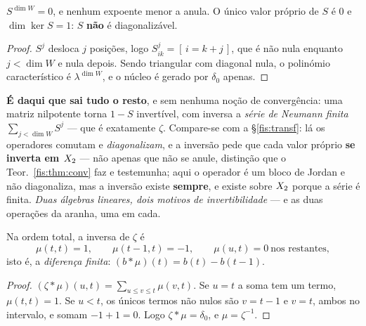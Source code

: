 \documentclass[livro.tex]{subfiles}
\begin{document}
\begin{lema}\label{fis:lem:nilp}
$S^{\dim W}=0$, e nenhum expoente menor a anula. O único valor próprio de $S$ é
$0$ e $\dim\ker S=1$: $S$ \textbf{não} é diagonalizável.
\end{lema}

\begin{proof}
$S^{j}$ desloca $j$ posições, logo $S^{j}_{ik}=[\,i=k+j\,]$, que é não nula
enquanto $j<\dim W$ e nula depois. Sendo triangular com diagonal nula, o
polinómio característico é $\lambda^{\dim W}$, e o núcleo é gerado por $\delta_0$
apenas.
\end{proof}

\medskip\noindent\textbf{É daqui que sai tudo o resto}, e sem nenhuma noção de
convergência: uma matriz nilpotente torna $1-S$ invertível, com inversa a
\emph{série de Neumann finita} $\sum_{j<\dim W}S^{j}$ --- que é exatamente
$\zeta$. Compare-se com a §\ref{fis:transf}: lá os operadores comutam e
\emph{diagonalizam}, e a inversão pede que cada valor próprio \textbf{se
inverta em $X_2$} --- não apenas que não se anule, distinção que o
Teor.~\ref{fis:thm:conv} faz e testemunha; aqui o operador é um bloco de Jordan
e não diagonaliza, mas a inversão existe \textbf{sempre}, e existe sobre $X_2$
porque a série é finita. \emph{Duas álgebras lineares, dois motivos de
invertibilidade} --- e as duas operações da aranha, uma em cada.

\begin{teorema}[$\mu=\zeta^{-1}$ na ordem total]\label{fis:thm:mu}
Na ordem total, a inversa de $\zeta$ é
\[
\mu(t,t)=1,\qquad \mu(t-1,t)=-1,\qquad \mu(u,t)=0\ \text{nos restantes},
\]
isto é, a \emph{diferença finita}: $(b*\mu)(t)=b(t)-b(t-1)$.
\end{teorema}

\begin{proof}
$(\zeta*\mu)(u,t)=\sum_{u\le v\le t}\mu(v,t)$. Se $u=t$ a soma tem um termo,
$\mu(t,t)=1$. Se $u<t$, os únicos termos não nulos são $v=t-1$ e $v=t$, ambos no
intervalo, e somam $-1+1=0$. Logo $\zeta*\mu=\delta_0$, e $\mu=\zeta^{-1}$.
\end{proof}
\end{document}
